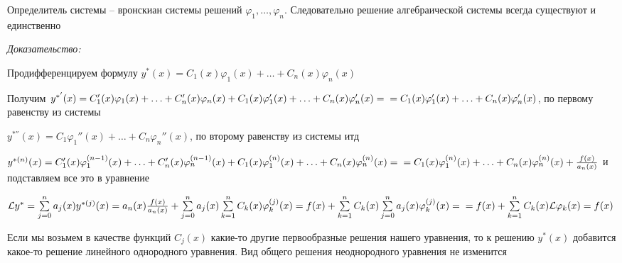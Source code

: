 \documentclass[12pt]{article}
\begin{document}
\begin{Remark}{}
    Определитель системы -- вронскиан системы решений $\varphi_1, \ldots, \varphi_n$. Следовательно решение алгебраической системы всегда существуют и единственно 
\end{Remark}

\textit{Доказательство:}

Продифференцируем формулу $y^*(x) = C_1(x)\varphi_1(x) + \ldots + C_n(x)\varphi_n(x)$

Получим $y^{*'}(x) = C_1'(x)\varphi_1(x) + \ldots + C_n'(x)\varphi_n(x) + C_1(x)\varphi_1'(x) + \ldots + C_n(x)\varphi_n'(x) = \\ = C_1(x)\varphi_1'(x) + \ldots + C_n(x)\varphi_n'(x)$, по первому равенству из системы

$y^{*''}(x) = C_1\varphi_1''(x) + \ldots + C_n\varphi_n''(x)$, по второму равенству из системы итд 

$y^{*(n)}(x) = C_1'(x)\varphi_1^{(n - 1)}(x) + \ldots + C_n'(x)\varphi_n^{(n - 1)}(x) + C_1(x)\varphi_1^{(n)}(x) + \ldots + C_n(x)\varphi_n^{(n)}(x) = \\ = C_1(x)\varphi_1^{(n)}(x) + \ldots + C_n(x)\varphi_n^{(n)}(x) + \frac{f(x)}{a_n(x)}$ и подставляем все это в уравнение 

$\mathcal{L} y^* = \sum\limits_{j = 0}^n a_j(x)y^{*(j)}(x) = a_n(x) \frac{f(x)}{a_n(x)} + \sum\limits_{j = 0}^n a_j(x) \sum\limits_{k = 1}^n C_k(x)\varphi_k^{(j)}(x) = f(x) + \sum\limits_{k = 1}^n C_k(x) \sum\limits_{j = 0}^n a_j(x)\varphi_k^{(j)}(x) = \\ = f(x) + \sum\limits_{k = 1}^n C_k(x) \mathcal{L} \varphi_k(x) = f(x)$

\begin{Remark}{}
    Если мы возьмем в качестве функций $C_j(x)$ какие-то другие первообразные решения нашего уравнения, то к решению $y^*(x)$ добавится какое-то решение линейного однородного уравнения. Вид общего решения неоднородного уравнения не изменится
\end{Remark}
\end{document}
